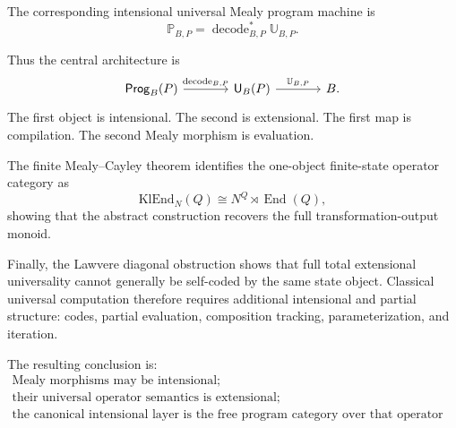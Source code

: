 The corresponding intensional universal Mealy program machine is
\[
        \mathbb P_{B,P}
        =
        \operatorname{decode}_{B,P}^{\ast}\mathbb U_{B,P}.
\]

Thus the central architecture is
\[
\begin{tikzcd}[column sep=large,row sep=large]
\mathsf{Prog}_B(P)
\ar[r,"\operatorname{decode}_{B,P}"]
&
\mathsf U_B(P)
\ar[r,"\mathbb U_{B,P}"]
&
B .
\end{tikzcd}
\]
The first object is intensional.  The second is extensional.  The first map is compilation.  The
second Mealy morphism is evaluation.

The finite Mealy--Cayley theorem identifies the one-object finite-state operator category as
\[
        \mathrm{KlEnd}_N(Q)
        \cong
        N^Q\rtimes\operatorname{End}(Q),
\]
showing that the abstract construction recovers the full transformation-output monoid.

Finally, the Lawvere diagonal obstruction shows that full total extensional universality cannot
generally be self-coded by the same state object.  Classical universal computation therefore
requires additional intensional and partial structure: codes, partial evaluation, composition
tracking, parameterization, and iteration.

The resulting conclusion is:
\[
\boxed{
\begin{array}{c}
\text{Mealy morphisms may be intensional;}\\
\text{their universal operator semantics is extensional;}\\
\text{the canonical intensional layer is the free program category over that operator semantics.}
\end{array}}
\]